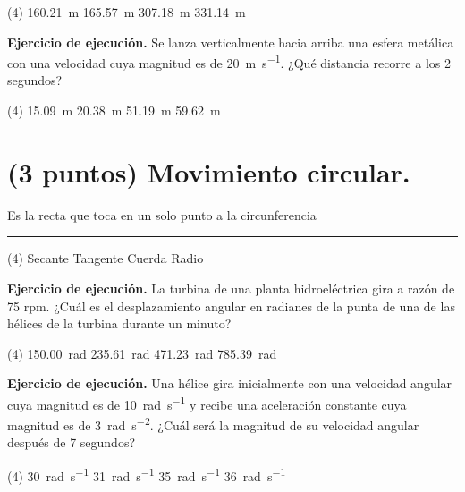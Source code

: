 \documentclass[12pt, letter]{exam}
\begin{document}
\begin{questions}
    \begin{tasks}(4)
        \task \SI{160.21}{\meter}
        \task \SI{165.57}{\meter}
        \task \SI{307.18}{\meter}
        \task \SI{331.14}{\meter}
    \end{tasks}
    \question \label{Ejercicio_06} \textbf{Ejercicio de ejecución. } Se lanza verticalmente hacia arriba una esfera metálica con una velocidad cuya magnitud es de \SI{20}{\meter\per\second}. ¿Qué distancia recorre a los \num{2} segundos?
    \begin{tasks}(4)
        \task \SI{15.09}{\meter}
        \task \SI{20.38}{\meter}
        \task \SI{51.19}{\meter}
        \task \SI{59.62}{\meter}
    \end{tasks}

    \section{(3 puntos) Movimiento circular.}

    \question Es la recta que toca en un solo punto a la circunferencia \rule{2cm}{0.1mm}
    \begin{tasks}(4)
        \task Secante
        \task Tangente
        \task Cuerda
        \task Radio
    \end{tasks}
    \question \label{Ejercicio_07} \textbf{Ejercicio de ejecución. } La turbina de una planta hidroeléctrica gira a razón de 75 rpm. ¿Cuál es el desplazamiento angular en radianes de la punta de una de las hélices de la turbina durante un minuto?
    \begin{tasks}(4)
        \task \SI{150.00}{\radian}
        \task \SI{235.61}{\radian}
        \task \SI{471.23}{\radian}
        \task \SI{785.39}{\radian}
    \end{tasks}
    \question \label{Ejercicio_09} \textbf{Ejercicio de ejecución. } Una hélice gira inicialmente con una velocidad angular cuya magnitud es de \SI{10}{\radian\per\second} y recibe una aceleración constante cuya magnitud es de \SI{3}{\radian\per\square\second}. ¿Cuál será la magnitud de su velocidad angular después de \num{7} segundos?
    \begin{tasks}(4)
        \task \SI{30}{\radian\per\second}
        \task \SI{31}{\radian\per\second}
        \task \SI{35}{\radian\per\second}
        \task \SI{36}{\radian\per\second}
    \end{tasks}


\end{questions}
\end{document}
